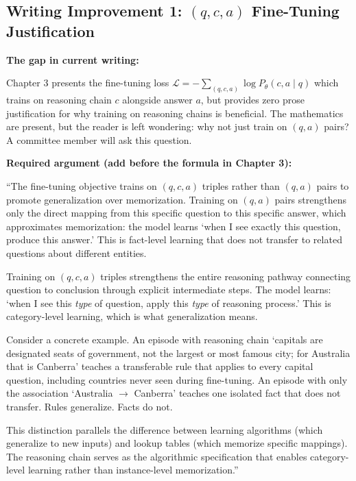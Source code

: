 \documentclass[11pt,a4paper]{article}
\newcommand{\implementbox}[2]{%
\begin{tcolorbox}[enhanced,breakable,
  colback=LightSlate,colframe=Slate,boxrule=1.5pt,arc=4pt,
  left=8pt,right=8pt,top=6pt,bottom=6pt,
  title={\bfseries\small\color{white}#1},
  attach boxed title to top left={yshift=-2mm,xshift=6mm},
  boxed title style={colback=Slate,arc=3pt,boxrule=0pt,
    left=4pt,right=4pt,top=2pt,bottom=2pt}]
#2
\end{tcolorbox}}
\begin{document}
\subsection{Writing Improvement 1: $(q,c,a)$ Fine-Tuning Justification}

\implementbox{WRITING IMPROVEMENT 1: Justify Training on Reasoning Chains}{
\textbf{The gap in current writing:}

Chapter 3 presents the fine-tuning loss $\mathcal{L} = -\sum_{(q,c,a)} \log P_\theta(c, a \mid q)$ which trains on reasoning chain $c$ alongside answer $a$, but provides zero prose justification for why training on reasoning chains is beneficial. The mathematics are present, but the reader is left wondering: why not just train on $(q,a)$ pairs? A committee member will ask this question.

\textbf{Required argument (add before the formula in Chapter 3):}

``The fine-tuning objective trains on $(q, c, a)$ triples rather than $(q, a)$ pairs to promote generalization over memorization. Training on $(q, a)$ pairs strengthens only the direct mapping from this specific question to this specific answer, which approximates memorization: the model learns `when I see exactly this question, produce this answer.' This is fact-level learning that does not transfer to related questions about different entities.

Training on $(q, c, a)$ triples strengthens the entire reasoning pathway connecting question to conclusion through explicit intermediate steps. The model learns: `when I see this \textit{type} of question, apply this \textit{type} of reasoning process.' This is category-level learning, which is what generalization means.

Consider a concrete example. An episode with reasoning chain `capitals are designated seats of government, not the largest or most famous city; for Australia that is Canberra' teaches a transferable rule that applies to every capital question, including countries never seen during fine-tuning. An episode with only the association `Australia $\to$ Canberra' teaches one isolated fact that does not transfer. Rules generalize. Facts do not.

This distinction parallels the difference between learning algorithms (which generalize to new inputs) and lookup tables (which memorize specific mappings). The reasoning chain serves as the algorithmic specification that enables category-level learning rather than instance-level memorization.''

}
\end{document}
